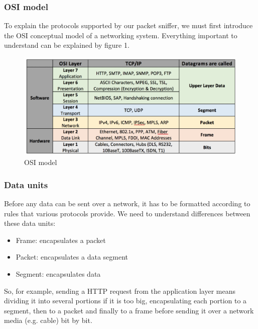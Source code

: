 \documentclass[a4paper]{article}
\begin{document}
  \subsubsection{OSI model}
  
  To explain the protocols supported by our packet sniffer, we must first 
  introduce the OSI conceptual model of a networking system. Everything 
  important to understand can be explained by figure 1.

  \begin{figure}[h]
    \centering
    \includegraphics[width=\textwidth]{./src/osi.eps}
    \caption{OSI model \cite{techsoftcenter:osi}}
  \end{figure}


  \subsubsection{Data units}

  Before any data can be sent over a network, it has to be formatted according
  to rules that various protocols provide. We need to understand differences
  between these data units:
  \begin{itemize}
    \item Frame: encapsulates a packet
    \item Packet: encapsulates a data segment
    \item Segment: encapsulates data
  \end{itemize}
  So, for example, sending a HTTP request from the application layer means
  dividing it into several portions if it is too big, encapsulating each portion
  to a segment, then to a packet and finally to a frame before sending it 
  over a network media (e.g. cable) bit by bit.
\end{document}
